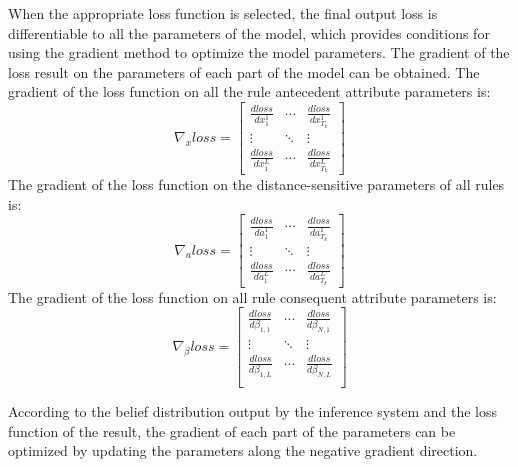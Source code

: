 \documentclass{ieeeaccess}
\begin{document}
When the appropriate loss function is selected, the final output loss is differentiable to all the parameters of the model, which provides conditions for using the gradient method to optimize the model parameters.
The gradient of the loss result on the parameters of each part of the model can be obtained. The gradient of the loss function on all the rule antecedent attribute parameters is:
\begin{equation}
    \nabla_{x}loss=\left[\begin{matrix}
            \frac{dloss}{dx_1^1} & \cdots & \frac{dloss}{dx_{T_k}^1} \\
            \vdots               & \ddots & \vdots                   \\
            \frac{dloss}{dx_1^L} & \cdots & \frac{dloss}{dx_{T_k}^L}
        \end{matrix}\right]
\end{equation}
The gradient of the loss function on the distance-sensitive parameters of all rules is:
\begin{equation}
    \nabla_{a}loss=\left[\begin{matrix}
            \frac{dloss}{da_1^1} & \cdots & \frac{dloss}{da_{T_k}^1} \\
            \vdots               & \ddots & \vdots                   \\
            \frac{dloss}{da_1^L} & \cdots & \frac{dloss}{da_{T_k}^L}
        \end{matrix}\right]
\end{equation}
The gradient of the loss function on all rule consequent attribute parameters is:
\begin{equation}
    \nabla_{\beta}loss=\left[\begin{matrix}
            \frac{dloss}{d\beta_{1,1}} & \cdots & \frac{dloss}{d\beta_{N,1}} \\
            \vdots                     & \ddots & \vdots                     \\
            \frac{dloss}{d\beta_{1,L}} & \cdots & \frac{dloss}{d\beta_{N,L}} \\
        \end{matrix}\right]
\end{equation}

According to the belief distribution output by the inference system and the loss function of the result,
the gradient of each part of the parameters can be optimized by updating the parameters along the negative gradient direction.
\end{document}
